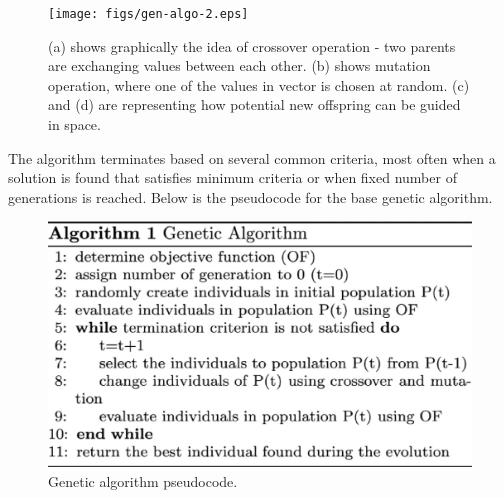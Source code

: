 \documentclass[12pt,a4paper,openany]{book}
\begin{document}
 \begin{figure}[ht!]
     \centering
     \texttt{[image: figs/gen-algo-2.eps]}
     \caption{(a) shows graphically the idea of crossover operation - two parents are exchanging values between each other.  (b) shows mutation operation, where one of the values in vector is chosen at random. (c) and (d) are representing how potential new offspring can be guided in space. \cite{de}}\label{Fig:PROGAN}
 \end{figure}
 
\noindent The algorithm terminates based on several common criteria, most often when a solution is found that satisfies minimum criteria or when fixed number of generations is reached. Below is the pseudocode for the base genetic algorithm. 

 \begin{figure}[H]
     \centering
     \includegraphics[scale=0.5]{figs/gen-algo-pseudo.eps}
     \caption{Genetic algorithm pseudocode. \cite{coimbra}}\label{Fig:PROGAN}
 \end{figure}

% 

\end{document}
